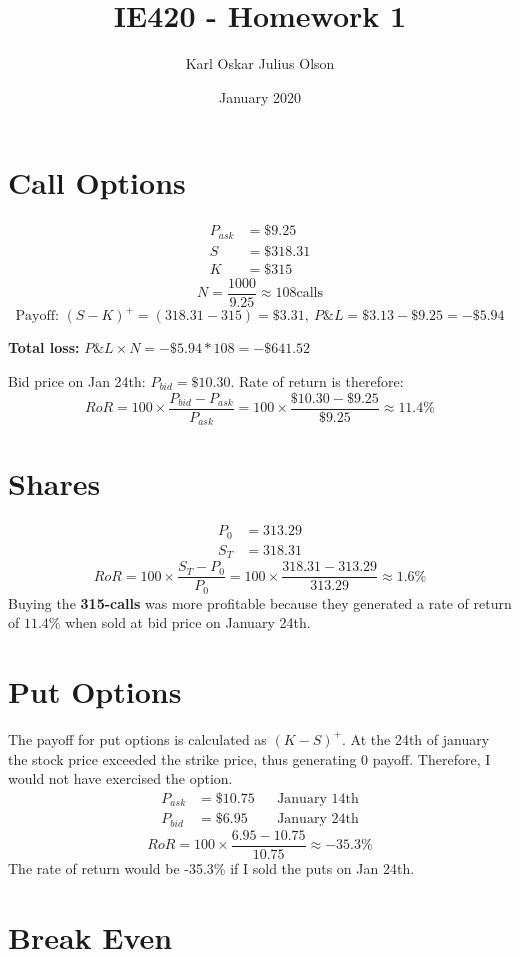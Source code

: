 \documentclass{article}
\title{IE420 - Homework 1}
\author{Karl Oskar Julius Olson}
\date{January 2020}
\begin{document}
\thispagestyle{fancy}

\section{Call Options}
\begin{align*}
	P_{ask} &= \$9.25 \\
	S &= \$318.31 \\
	K &= \$315
\end{align*}
$$N = \frac{1000}{9.25} \approx 108  \text{calls}$$
$$\text{Payoff: } (S-K)^+ = (318.31 - 315) = \$3.31, \ P\&L = \$3.13-\$9.25 = -\$5.94$$

\textbf{Total loss:} $P\&L \times N = -\$5.94 * 108 = -\$641.52$

Bid price on Jan 24th: $P_{bid} = \$10.30$. Rate of return is therefore: $$RoR = 100 \times \frac{P_{bid}-P_{ask}}{P_{ask}} = 100 \times \frac{\$10.30-\$9.25}{\$9.25} \approx 11.4\%$$

\section{Shares}

\begin{align*}
	P_0 &= 313.29 \\
	S_T &= 318.31
\end{align*}
$$RoR = 100 \times \frac{S_T-P_0}{P_0} = 100 \times \frac{318.31-313.29}{313.29} \approx 1.6\%$$
Buying the \textbf{315-calls} was more profitable because they generated a rate of return of $11.4\%$ when sold at bid price on January 24th. 

\section{Put Options}

The payoff for put options is calculated as $(K-S)^+$. At the 24th of january the stock price exceeded the strike price, thus generating 0 payoff. Therefore, I would not have exercised the option.
\begin{align*}
	P_{ask} &= \$10.75  && \text{January 14th}\\
	P_{bid} &= \$6.95 && \text{January 24th}
\end{align*}
$$RoR = 100 \times \frac{6.95-10.75}{10.75} \approx -35.3 \%$$
The rate of return would be -35.3\% if I sold the puts on Jan 24th.

\section{Break Even}
\end{document}
